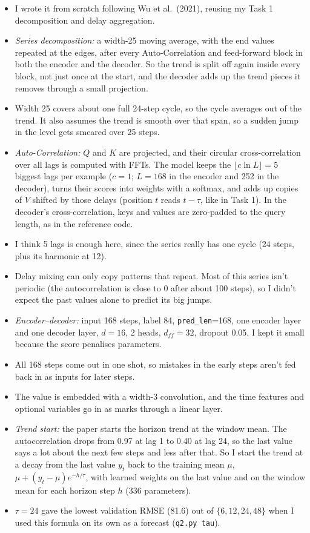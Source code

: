 \documentclass[10pt]{article}
\begin{document}
\begin{itemize}
\item I wrote it from scratch following Wu et al.\ (2021), reusing my Task 1 decomposition and delay aggregation.
\item \emph{Series decomposition:} a width-25 moving average, with the end values repeated at the edges, after every Auto-Correlation and feed-forward block in both the encoder and the decoder. So the trend is split off again inside every block, not just once at the start, and the decoder adds up the trend pieces it removes through a small projection.
\item Width 25 covers about one full 24-step cycle, so the cycle averages out of the trend. It also assumes the trend is smooth over that span, so a sudden jump in the level gets smeared over 25 steps.
\item \emph{Auto-Correlation:} $Q$ and $K$ are projected, and their circular cross-correlation over all lags is computed with FFTs. The model keeps the $\lfloor c\ln L\rfloor=5$ biggest lags per example ($c=1$; $L=168$ in the encoder and 252 in the decoder), turns their scores into weights with a softmax, and adds up copies of $V$ shifted by those delays (position $t$ reads $t-\tau$, like in Task 1). In the decoder's cross-correlation, keys and values are zero-padded to the query length, as in the reference code.
\item I think 5 lags is enough here, since the series really has one cycle (24 steps, plus its harmonic at 12).
\item Delay mixing can only copy patterns that repeat. Most of this series isn't periodic (the autocorrelation is close to 0 after about 100 steps), so I didn't expect the past values alone to predict its big jumps.
\item \emph{Encoder--decoder:} input 168 steps, label 84, \texttt{pred\_len}=168, one encoder layer and one decoder layer, $d=16$, 2 heads, $d_{ff}=32$, dropout 0.05. I kept it small because the score penalises parameters.
\item All 168 steps come out in one shot, so mistakes in the early steps aren't fed back in as inputs for later steps.
\item The value is embedded with a width-3 convolution, and the time features and optional variables go in as marks through a linear layer.
\item \emph{Trend start:} the paper starts the horizon trend at the window mean. The autocorrelation drops from 0.97 at lag 1 to 0.40 at lag 24, so the last value says a lot about the next few steps and less after that. So I start the trend at a decay from the last value $y_t$ back to the training mean $\mu$, $\mu+(y_t-\mu)e^{-h/\tau}$, with learned weights on the last value and on the window mean for each horizon step $h$ (336 parameters).
\item $\tau=24$ gave the lowest validation RMSE (81.6) out of $\{6,12,24,48\}$ when I used this formula on its own as a forecast (\texttt{q2.py tau}).
\end{itemize}
\end{document}
